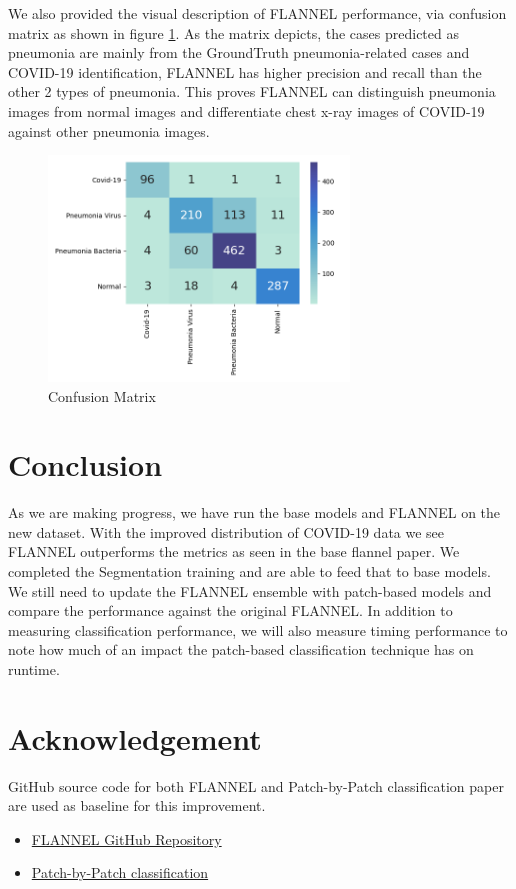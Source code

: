 \documentclass{sigkddExp}
\begin{document}
We also provided the visual description of FLANNEL performance, via confusion
matrix as shown in figure \ref{fig:cfmatrix}. As the matrix depicts, the cases
predicted as pneumonia are mainly from the GroundTruth pneumonia-related cases
and COVID-19 identification, FLANNEL has higher precision and recall than the
other 2 types of pneumonia. This proves FLANNEL can distinguish pneumonia images
from normal images and differentiate chest x-ray images of COVID-19 against
other pneumonia images.

\begin{figure}[h]
    \includegraphics[width=8cm]{../doc/images/confusion_matrix.png}
    \caption{Confusion Matrix}
    \label{fig:cfmatrix}
\end{figure}

\section{Conclusion}
As we are making progress, we have run the base models and FLANNEL on the new
dataset. With the improved distribution of COVID-19 data we see FLANNEL
outperforms the metrics as seen in the base flannel paper. We completed the
Segmentation training and are able to feed that to base models. We still need to
update the FLANNEL ensemble with patch-based models and compare the performance
against the original FLANNEL. In addition to measuring classification
performance, we will also measure timing performance to note how much of an
impact the patch-based classification technique has on runtime.

\section{Acknowledgement}
GitHub source code for both FLANNEL and Patch-by-Patch classification \cite{pmid32396075}
paper are used as baseline for this improvement.
\begin{itemize}
    \item \href{https://github.com/qxiaobu/FLANNEL}{FLANNEL GitHub Repository}
    \item \href{https://github.com/jongcye/Deep-Learning-COVID-19-on-CXR-using-Limited-Training-Data-Sets}
          {Patch-by-Patch classification}
\end{itemize}



\clearpage
%

\end{document}
